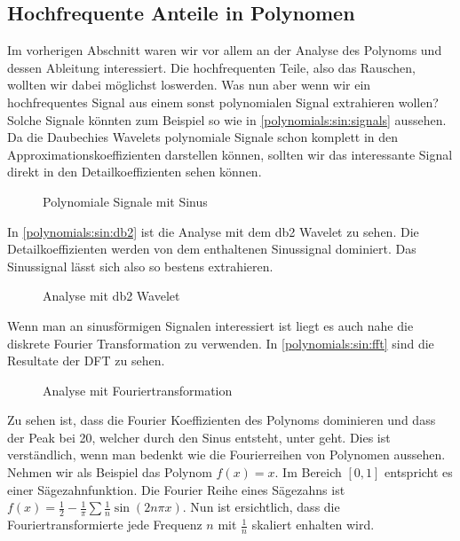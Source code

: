 \begin{refsection}
\section{Hochfrequente Anteile in Polynomen}

Im vorherigen Abschnitt waren wir vor allem an der Analyse des Polynoms und
dessen Ableitung interessiert. Die hochfrequenten Teile, also das Rauschen,
wollten wir dabei möglichst loswerden. Was nun aber wenn wir ein hochfrequentes
Signal aus einem sonst polynomialen Signal extrahieren wollen? Solche Signale
könnten zum Beispiel so wie in \autoref{polynomials:sin:signals} aussehen. Da
die Daubechies Wavelets polynomiale Signale schon komplett in den
Approximationskoeffizienten darstellen können, sollten wir das interessante
Signal direkt in den Detailkoeffizienten sehen können.

\begin{figure}
    \centering
    
    \caption{Polynomiale Signale mit Sinus\label{polynomials:sin:signals}}
\end{figure}

In \autoref{polynomials:sin:db2} ist die Analyse mit dem db2 Wavelet zu sehen.
Die Detailkoeffizienten werden von dem enthaltenen Sinussignal dominiert. Das
Sinussignal lässt sich also so bestens extrahieren.

\begin{figure}
    \centering
    
    \caption{Analyse mit db2 Wavelet\label{polynomials:sin:db2}}
\end{figure}

Wenn man an sinusförmigen Signalen interessiert ist liegt es auch nahe die
diskrete Fourier Transformation zu verwenden. In \autoref{polynomials:sin:fft}
sind die Resultate der DFT zu sehen.

\begin{figure}
    \centering
    
    \caption{Analyse mit Fouriertransformation\label{polynomials:sin:fft}}
\end{figure}

Zu sehen ist, dass die Fourier Koeffizienten des Polynoms dominieren und dass
der Peak bei 20, welcher durch den Sinus entsteht, unter geht. Dies ist
verständlich, wenn man bedenkt wie die Fourierreihen von Polynomen aussehen.
Nehmen wir als Beispiel das Polynom $f(x) = x$. Im Bereich $[0, 1]$ entspricht
es einer Sägezahnfunktion. Die Fourier Reihe eines Sägezahns ist $f(x) =
\frac{1}{2} - \frac{1}{\pi} \sum{\frac{1}{n} \sin(2 n \pi x)}$. Nun ist
ersichtlich, dass die Fouriertransformierte jede Frequenz $n$ mit $\frac{1}{n}$
skaliert enhalten wird.


\end{refsection}
